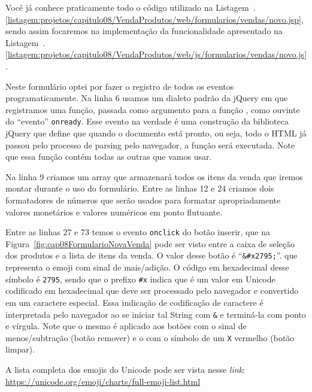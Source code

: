 Você já conhece praticamente todo o código utilizado na Listagem~\thechapter.\ref{listagem:projetos/capitulo08/VendaProdutos/web/formularios/vendas/novo.jsp}, sendo assim focaremos na implementação da funcionalidade apresentado na Listagem~\thechapter.\ref{listagem:projetos/capitulo08/VendaProdutos/web/js/formularios/vendas/novo.js}.


Neste formulário optei por fazer o registro de todos os eventos programaticamente. Na linha 6 usamos um dialeto padrão da jQuery em que registramos uma função, passada como argumento para a função , como ouvinte do ``evento'' \texttt{onready}. Esse evento na verdade é uma construção da biblioteca jQuery que define que quando o documento está pronto, ou seja, todo o HTML já passou pelo processo de parsing pelo navegador, a função será executada. Note que essa função contém todas as outras que vamos usar.

Na linha 9 criamos um array que armazenará todos os itens da venda que iremos montar durante o uso do formulário. Entre as linhas 12 e 24 criamos dois formatadores de números que serão usados para formatar apropriadamente valores monetários e valores numéricos em ponto flutuante.

Entre as linhas 27 e 73 temos o evento \texttt{onclick} do botão inserir, que na Figura~\ref{fig:cap08FormularioNovaVenda} pode ser visto entre a caixa de seleção dos produtos e a lista de itens da venda. O valor desse botão é ``\texttt{\&\#x2795;}''. que representa o emoji com sinal de mais/adição. O código em hexadecimal desse símbolo é \texttt{2795}, sendo que o prefixo \texttt{\#x} indica que é um valor em Unicode codificado em hexadecimal que deve ser processado pelo navegador e convertido em um caractere especial. Essa indicação de codificação de caractere é interpretada pelo navegador ao se iniciar tal String com \texttt{\&} e terminá-la com ponto e vírgula. Note que o mesmo é aplicado aos botões com o sinal de menos/subtração (botão remover) e o com o símbolo de um \texttt{X} vermelho (botão limpar).

\begin{saibaMais}
    A lista completa dos emojis do Unicode pode ser vista nesse \textit{link}: \url{https://unicode.org/emoji/charts/full-emoji-list.html}
\end{saibaMais}


